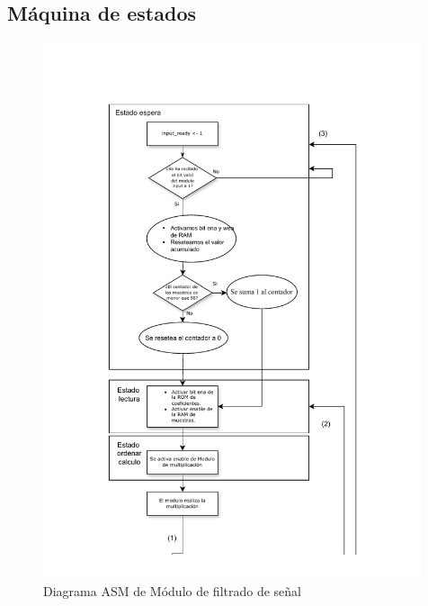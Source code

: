 \subsection{Máquina de estados}

\begin{figure}[h!]
    \centering
    \includegraphics[width=0.99\textwidth]{./Images/img_implementacion_hw/Diagramaasmfiltrado1.pdf}
    \caption{Diagrama ASM de Módulo de filtrado de señal}
    \label{fig:Diagramaasmfiltrado1}
\end{figure} 

